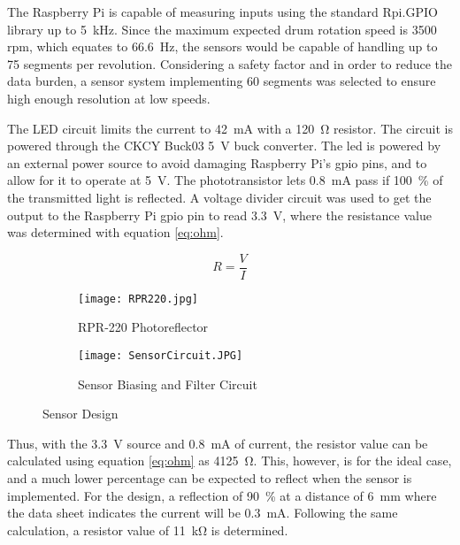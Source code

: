 The Raspberry Pi is capable of measuring inputs using the standard Rpi.GPIO library up to \SI{5}{\kilo\hertz}. Since the maximum expected drum rotation speed is 3500 \acs{rpm}, which equates to \SI{66.6}{\hertz}, the sensors would be capable of handling up to 75 segments per revolution. Considering a safety factor and in order to reduce the data burden, a sensor system implementing 60 segments was selected to ensure high enough resolution at low speeds.

The LED circuit limits the current to \SI{42}{\milli\ampere} with a \SI{120}{\ohm} resistor. The circuit is powered through the CKCY Buck03 \SI{5}{\volt} buck converter. The \acs{led} is powered by an external power source to avoid damaging Raspberry Pi's \acs{gpio} pins, and to allow for it to operate at \SI{5}{\volt}. The phototransistor lets \SI{0.8}{\milli\ampere} pass if \SI{100}{\percent} of the transmitted light is reflected. A voltage divider circuit was used to get the output to the Raspberry Pi \ac{gpio} pin to read \SI{3.3}{\volt}, where the resistance value was determined with equation \ref{eq:ohm}. 

\begin{equation}
	R = \frac{V}{I}
	\label{eq:ohm}
\end{equation}

\begin{figure}[H]
	\centering
	\begin{subfigure}[t]{.315\textwidth}
		\centering
		\texttt{[image: RPR220.jpg]}
		\caption{RPR-220 Photoreflector}
		\citep{RPR:2015}
		\label{fig:rpr}
	\end{subfigure}
	\begin{subfigure}[t]{.65\textwidth}
		\centering
		\texttt{[image: SensorCircuit.JPG]}
		\caption{Sensor Biasing and Filter Circuit}
		\label{fig:sensorD}
	\end{subfigure}
	\caption{Sensor Design}
	\label{fig:Sensor}
\end{figure}

Thus, with the \SI{3.3}{\volt} source and \SI{0.8}{\milli\ampere} of current, the resistor value can be calculated using equation \ref{eq:ohm} as \SI{4125}{\ohm}. This, however, is for the ideal case, and a much lower percentage can be expected to reflect when the sensor is implemented. For the design, a reflection of \SI{90}{\percent} at a distance of \SI{6}{\milli\meter} where the data sheet indicates the current will be \SI{0.3}{\milli\ampere}. Following the same calculation, a resistor value of \SI{11}{\kilo\ohm} is determined.

